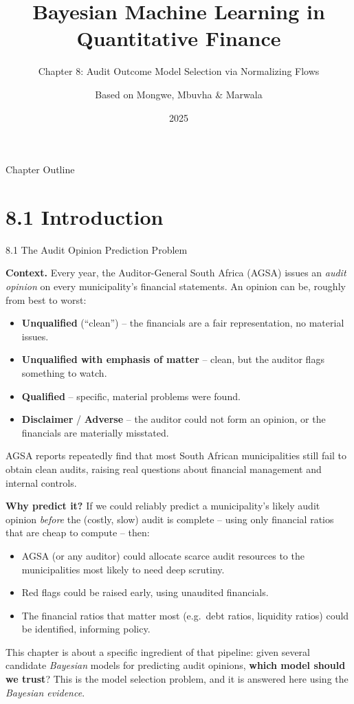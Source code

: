 \documentclass[aspectratio=169,10pt]{beamer}
\title[Bayesian ML in QF -- Ch.8]{Bayesian Machine Learning in Quantitative Finance}
\subtitle{Chapter 8: Audit Outcome Model Selection via Normalizing Flows}
\author{Based on Mongwe, Mbuvha \& Marwala}
\date{2025}
\begin{document}
\begin{frame}
  \titlepage
\end{frame}

\begin{frame}{Chapter Outline}
  \tableofcontents
\end{frame}

\section{8.1 Introduction}

\begin{frame}[allowframebreaks]{8.1 The Audit Opinion Prediction Problem}

\textbf{Context.} Every year, the Auditor-General South Africa (AGSA) issues an \emph{audit opinion} on every municipality's financial statements. An opinion can be, roughly from best to worst:
\begin{itemize}
  \item \textbf{Unqualified} (``clean'') -- the financials are a fair representation, no material issues.
  \item \textbf{Unqualified with emphasis of matter} -- clean, but the auditor flags something to watch.
  \item \textbf{Qualified} -- specific, material problems were found.
  \item \textbf{Disclaimer} / \textbf{Adverse} -- the auditor could not form an opinion, or the financials are materially misstated.
\end{itemize}
AGSA reports repeatedly find that most South African municipalities still fail to obtain clean audits, raising real questions about financial management and internal controls.

\framebreak

\textbf{Why predict it?} If we could reliably predict a municipality's likely audit opinion \emph{before} the (costly, slow) audit is complete -- using only financial ratios that are cheap to compute -- then:
\begin{itemize}
  \item AGSA (or any auditor) could allocate scarce audit resources to the municipalities most likely to need deep scrutiny.
  \item Red flags could be raised early, using unaudited financials.
  \item The financial ratios that matter most (e.g.\ debt ratios, liquidity ratios) could be identified, informing policy.
\end{itemize}

This chapter is about a specific ingredient of that pipeline: given several candidate \emph{Bayesian} models for predicting audit opinions, \textbf{which model should we trust}? This is the model selection problem, and it is answered here using the \emph{Bayesian evidence}.

\end{frame}
\end{document}
